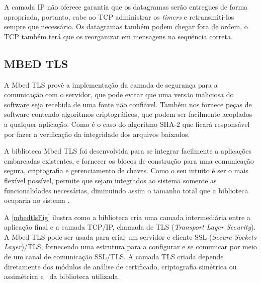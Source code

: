 A camada IP não oferece garantia que os datagramas serão entregues de forma apropriada, portanto, cabe ao TCP administrar os \textit{timers} e retransmiti-los sempre que necessário. Os datagramas também podem chegar fora de ordem, o TCP também terá que os reorganizar em mensagens na sequência correta.



\subsection{MBED TLS}
A Mbed TLS provê a implementação da camada de segurança para a comunicação com o servidor, que pode evitar que uma versão maliciosa do software seja recebida de uma fonte não confiável. Também nos fornece peças de software contendo algoritmos criptográficos, que podem ser facilmente acoplados a qualquer aplicação. Como é o caso do algoritmo SHA-2 que ficará responsável por fazer a verificação da integridade dos arquivos baixados.

A biblioteca Mbed TLS foi desenvolvida para se integrar facilmente a aplicações embarcadas existentes, e fornecer os blocos de construção para uma comunicação segura, criptografia e gerenciamento de chaves. Como o seu intuito é ser o mais flexível possível, permite que sejam integrados ao sistema somente as funcionalidades necessárias, diminuindo assim o tamanho total que a biblioteca ocuparia no sistema \cite{mbedtls}.

A \autoref{mbedtlsFig} ilustra como a biblioteca cria uma camada intermediária entre a aplicação final e a camada TCP/IP, chamada de TLS (\textit{Transport Layer Security}). A Mbed TLS pode ser usada para criar um servidor e cliente SSL (\textit{Secure Sockets Layer})/TLS, fornecendo uma estrutura para a configurar e se comunicar por meio de um canal de comunicação SSL/TLS. A camada TLS criada depende diretamente dos módulos de análise de certificado, criptografia simétrica ou assimétrica e \hash\ da biblioteca utilizada.

